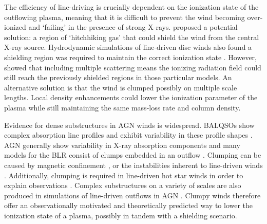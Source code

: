 \documentclass[useAMS,usenatbib]{mn2e_x}
\begin{document}
The efficiency of line-driving is crucially dependent on the ionization state 
of the outflowing plasma, meaning that it is difficult to prevent 
the wind becoming over-ionized and `failing' in the presence of strong X-rays. 
\cite{MCGV95} proposed a potential solution: 
a region of `hitchhiking gas' that could shield the wind from the central X-ray source. 
Hydrodynamic simulations of line-driven disc winds also found a shielding region
was required to maintain the correct ionization state \citep{PSK2000,PK04}. 
However, \cite{H14} showed that including multiple scattering means the ionizing radiation 
field could still reach the previously shielded regions in those particular models.
An alternative solution is that the wind is clumped \citep[e.g.][]{hamann2013}
possibly on multiple scale lengths. Local density enhancements could lower the 
ionization parameter of the plasma while still maintaining the same mass-loss 
rate and column density. 


Evidence for dense substructures in AGN winds is widespread.
BALQSOs show complex absorption line profiles \citep{ganguly2006, simonhamann2010}
and exhibit variability in these profile shapes \citep{capellupo2011,capellupo2012,capellupo2014}.
AGN generally show variability in X-ray absorption components \citep[e.g.][]{risaliti2002}
and many models for the BLR consist of clumps embedded in an outflow 
\citep{krolik1981, emmering1992, dekool1995, cassidyraine1996}.
Clumping can be caused by magnetic confinement \cite{dekool1995},
or the instabilities inherent to line-driven winds 
\citep{lucysolomon1970,macgregor1979,carlberg1980,owockirybicki1984,owockirybicki1985}.
Additionally, clumping is required in line-driven hot star winds 
in order to explain observations \citep{hillier1991eswingsmodel}. Complex substructures 
on a variety of scales are also produced in simulations of line-driven 
outflows in AGN \citep{PSK2000,PK04,progakurosawa2010,proga2014}.
Clumpy winds therefore offer an observationally motivated and theoretically 
predicted way to lower the ionization state of a plasma, possibly in tandem
with a shielding scenario. 




\end{document}
